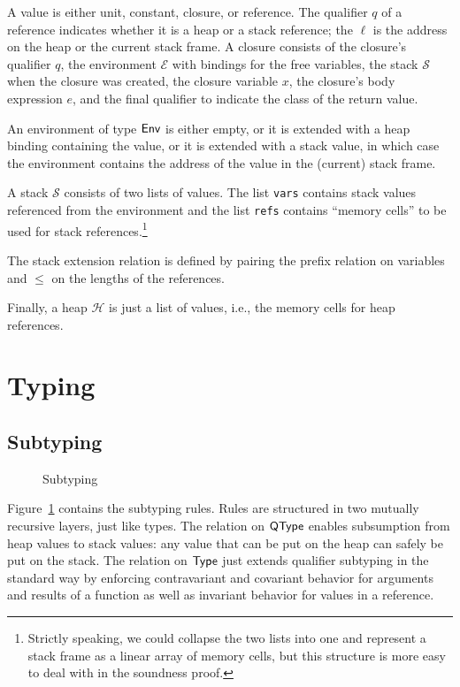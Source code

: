 \documentclass[sigplan,review,dvipsnames,screen,10pt]{acmart}
\begin{document}
\Values

A value is either unit, constant, closure, or reference. The qualifier
$q$ of a reference indicates whether it is a heap or a stack
reference; the $\ell$ is the address on the heap or the current stack
frame. A closure consists of the closure's qualifier $q$, the
environment $\mathcal{E}$ with bindings for the free variables, the
stack $\mathcal{S}$ when the closure was created, the closure variable
$x$, the closure's body expression $e$, and the final qualifier to
indicate the class of the return value.

An environment of type $\AEnv$ is either empty, or it is extended with
a heap binding containing the value, or it is extended with a stack
value, in which case the environment contains the address of the value
in the (current) stack frame.

A stack $\mathcal{S}$ consists of two lists of values. The list
\texttt{vars} contains stack values referenced from the environment
and the list \texttt{refs} contains ``memory cells'' to be used for
stack references.\footnote{Strictly speaking, we could collapse the
  two lists into one and represent a stack frame as a linear array of
  memory cells, but this structure is more easy to deal with in the
  soundness proof.}

The stack extension relation is defined by pairing the prefix relation
on variables and $\le$ on the lengths of the references.
\StackExtension

Finally, a heap $\mathcal{H}$ is just a list of values, i.e., the
memory cells for heap references. 

\section{Typing}
\label{sec:typing}


\subsection{Subtyping}
\label{sec:subtyping}
\begin{figure}[tp]
  \SubtypingRelation  
  \caption{Subtyping}
  \label{fig:subtyping}
\end{figure}

Figure~\ref{fig:subtyping} contains the subtyping rules. Rules are
structured in two mutually recursive layers, just like types. The
relation on $\AQType$ enables subsumption from heap values to stack
values: any value that can be put on the heap can safely be put
on the stack. The relation on $\AType$ just extends qualifier
subtyping in the standard way by enforcing contravariant and covariant
behavior for arguments and results of a function as well as invariant
behavior for values in a reference.
\end{document}
